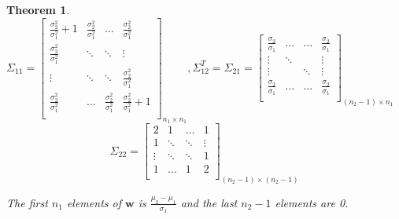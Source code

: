 \documentclass[12pt]{article}
\newtheorem{theorem}{Theorem}[section]
\begin{document}
\begin{theorem}
$\Sigma_{11} = \begin{bmatrix}
\frac{\sigma_2^2}{\sigma_1^2}+1 & \frac{\sigma_2^2}{\sigma_1^2} & \hdots & \frac{\sigma_2^2}{\sigma_1^2} \\
\frac{\sigma_2^2}{\sigma_1^2} & \ddots & \ddots  & \vdots \\
\vdots & \ddots & \ddots & \frac{\sigma_2^2}{\sigma_1^2} \\
\frac{\sigma_2^2}{\sigma_1^2} & \dots & \frac{\sigma_2^2}{\sigma_1^2} & \frac{\sigma_2^2}{\sigma_1^2}+1\\
\end{bmatrix}_{n_1 \times n_1}, 
\Sigma_{12}^{T} = \Sigma_{21} = \begin{bmatrix}
\frac{\sigma_2}{\sigma_1} & \hdots & \hdots & \frac{\sigma_2}{\sigma_1}\\
\vdots & \ddots &  & \vdots\\
\vdots &  & \ddots & \vdots\\
\frac{\sigma_2}{\sigma_1} & \hdots &\hdots & \frac{\sigma_2}{\sigma_1}\\
\end{bmatrix}_{(n_2-1) \times n_1}$
$$
\Sigma_{22} = \begin{bmatrix}
2 & 1 & \hdots & 1\\
1 & \ddots & \ddots & \vdots\\
\vdots & \ddots & \ddots & 1\\
1 & \hdots & 1 & 2\\
\end{bmatrix}_{(n_2-1) \times (n_2-1)}$$

The first $n_1$ elements of $\mathbf{w}$ is $\frac{\mu_2 - \mu_1}{\sigma_1}$ and the last $n_2-1$ elements are 0. 

\end{theorem}
\end{document}
